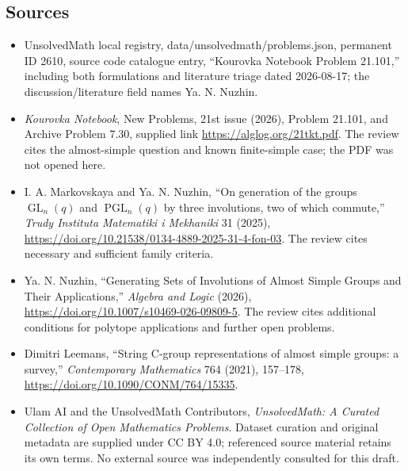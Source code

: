\documentclass[11pt]{article}
\begin{document}
\subsection{Sources}
\begin{itemize}
\item UnsolvedMath local registry, data/unsolvedmath/problems.json, permanent ID 2610, source code catalogue entry, ``Kourovka Notebook Problem 21.101,'' including both formulations and literature triage dated 2026-08-17; the discussion/literature field names Ya. N. Nuzhin.
\item \emph{Kourovka Notebook}, New Problems, 21st issue (2026), Problem 21.101, and Archive Problem 7.30, supplied link \url{https://alglog.org/21tkt.pdf}. The review cites the almost-simple question and known finite-simple case; the PDF was not opened here.
\item I. A. Markovskaya and Ya. N. Nuzhin, ``On generation of the groups $\operatorname{GL}_n(q)$ and $\operatorname{PGL}_n(q)$ by three involutions, two of which commute,'' \emph{Trudy Instituta Matematiki i Mekhaniki} 31 (2025), \url{https://doi.org/10.21538/0134-4889-2025-31-4-fon-03}. The review cites necessary and sufficient family criteria.
\item Ya. N. Nuzhin, ``Generating Sets of Involutions of Almost Simple Groups and Their Applications,'' \emph{Algebra and Logic} (2026), \url{https://doi.org/10.1007/s10469-026-09809-5}. The review cites additional conditions for polytope applications and further open problems.
\item Dimitri Leemans, ``String C-group representations of almost simple groups: a survey,'' \emph{Contemporary Mathematics} 764 (2021), 157--178, \url{https://doi.org/10.1090/CONM/764/15335}.
\item Ulam AI and the UnsolvedMath Contributors, \emph{UnsolvedMath: A Curated Collection of Open Mathematics Problems}. Dataset curation and original metadata are supplied under CC BY 4.0; referenced source material retains its own terms. No external source was independently consulted for this draft.
\end{itemize}
\end{document}
